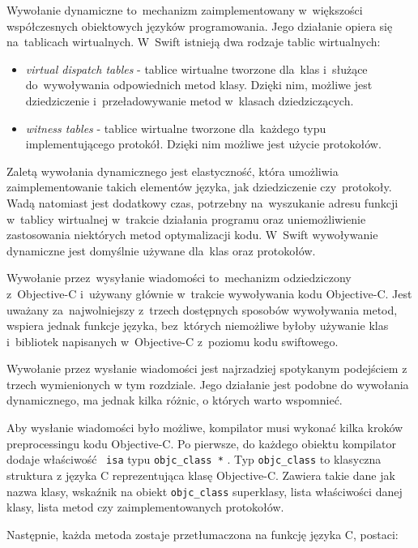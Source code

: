 \documentclass[mgr, shortabstract]{iithesis}
\newcommand{\objcinline}[1]{
    \texttt{#1}
}
\begin{document}
Wywołanie dynamiczne to~mechanizm zaimplementowany w~większości współczesnych obiektowych języków programowania. Jego działanie opiera się na~tablicach wirtualnych. W~Swift istnieją dwa rodzaje tablic wirtualnych:

\begin{itemize}
    \item \textit{virtual dispatch tables} - tablice wirtualne tworzone dla~klas i~służące do~wywoływania odpowiednich metod klasy. Dzięki nim, możliwe jest dziedziczenie i~przeładowywanie metod w~klasach dziedziczących.
    \item \textit{witness tables} - tablice wirtualne tworzone dla~każdego typu implementującego protokół. Dzięki nim możliwe jest użycie protokołów.
\end{itemize}

Zaletą wywołania dynamicznego jest elastyczność, która umożliwia zaimplementowanie takich elementów języka, jak dziedziczenie czy~protokoły. Wadą natomiast jest dodatkowy czas, potrzebny na~wyszukanie adresu funkcji w~tablicy wirtualnej w~trakcie działania programu oraz uniemożliwienie zastosowania niektórych metod optymalizacji kodu. W~Swift wywoływanie dynamiczne jest domyślnie używane dla~klas oraz protokołów.

Wywołanie przez~wysyłanie wiadomości to~mechanizm odziedziczony z~Objective-C i~używany głównie w~trakcie wywoływania kodu Objective-C. Jest uważany za~najwolniejszy z~trzech dostępnych sposobów wywoływania metod, wspiera jednak funkcje języka, bez~których niemożliwe byłoby używanie klas i~bibliotek napisanych w~Objective-C z~poziomu kodu swiftowego.

Wywołanie przez wysłanie wiadomości jest najrzadziej spotykanym podejściem z trzech wymienionych w tym rozdziale. Jego działanie jest podobne do wywołania dynamicznego, ma jednak kilka różnic, o których warto wspomnieć.

Aby wysłanie wiadomości było możliwe, kompilator musi wykonać kilka kroków preprocessingu kodu Objective-C. Po pierwsze, do każdego obiektu kompilator dodaje właściwość \objcinline{isa} typu \objcinline{objc_class *}. Typ \objcinline{objc_class} to klasyczna struktura z języka C reprezentująca klasę Objective-C. Zawiera takie dane jak nazwa klasy, wskaźnik na obiekt \objcinline{objc_class} superklasy, lista właściwości danej klasy, lista metod czy zaimplementowanych protokołów.

Następnie, każda metoda zostaje przetłumaczona na funkcję języka C, postaci:
\end{document}
